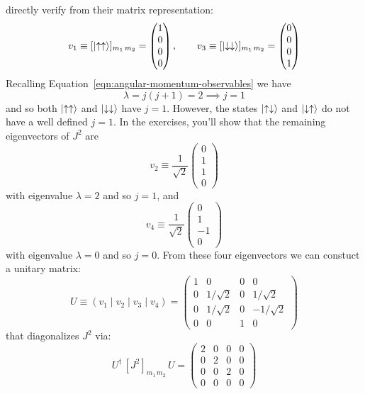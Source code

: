 \documentclass[12pt]{article}
\begin{document}
directly verify from their matrix representation:
$$v_1 \equiv [\ket{\uparrow\uparrow}]_{m_1\, m_2}=\begin{pmatrix}1\\0\\0\\0\end{pmatrix}, \quad \quad
v_3 \equiv [\ket{\downarrow\downarrow}]_{m_1\, m_2}=\begin{pmatrix}0\\0\\0\\1\end{pmatrix}$$
Recalling Equation~\ref{eqn:angular-momentum-observables} we have
$$\lambda = j(j+1) = 2 \implies j=1$$
and so both $\ket{\uparrow\uparrow}$ and $\ket{\downarrow\downarrow}$
have $j=1$.  However, the states $\ket{\uparrow\downarrow}$ and
$\ket{\downarrow\uparrow}$ do not have a well defined $j=1$.  In the exercises, you'll show
that the remaining eigenvectors of $J^2$ are
$$v_2 \equiv \frac{1}{\sqrt{2}}\begin{pmatrix}0\\1\\1\\0 \end{pmatrix}$$
with eigenvalue $\lambda=2$ and so $j=1$, and
$$v_4 \equiv \frac{1}{\sqrt{2}}\begin{pmatrix}0\\1\\-1\\0 \end{pmatrix}$$
with eigenvalue $\lambda=0$ and so $j=0$.
From these four eigenvectors we can constuct a unitary matrix:
\begin{equation}
\label{eqn:u-diagonal}
U \equiv (v_1 \mid v_2 \mid v_3 \mid v_4) = 
\begin{pmatrix}1&0&0&0\\0&1/\sqrt{2}&0&1/\sqrt{2}\\0&1/\sqrt{2}&0&-1/\sqrt{2}\\0&0&1&0\end{pmatrix}
\end{equation}
that diagonalizes $J^2$ via:
\begin{equation}
\label{eqn:jsq_jm}
U^\dagger \, [J^2]_{m_1\,m_2} \, U
= \begin{pmatrix}2&0&0&0\\0&2&0&0\\0&0&2&0\\0&0&0&0\end{pmatrix}
\end{equation}
\end{document}
